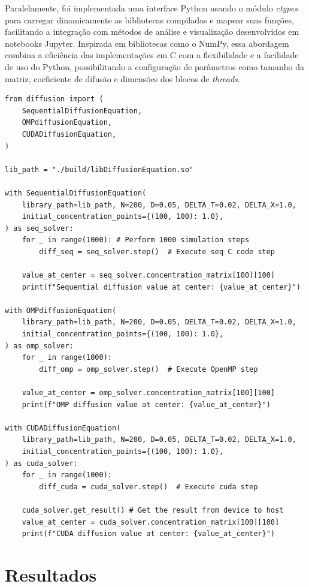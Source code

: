\documentclass[12pt]{article}
\begin{document}
Paralelamente, foi implementada uma interface Python usando o módulo
\textit{ctypes} para carregar dinamicamente as bibliotecas compiladas e mapear
suas funções, facilitando a integração com métodos de análise e visualização
desenvolvidos em notebooks Jupyter. Inspirada em bibliotecas como o NumPy, essa
abordagem combina a eficiência das implementações em C com a flexibilidade e a
facilidade de uso do Python, possibilitando a configuração de parâmetros como
tamanho da matriz, coeficiente de difusão e dimensões dos blocos de
\textit{threads}.

\begin{lstlisting}[style=PythonStyle, caption={Implementação paralelizada utilizando CUDA.}, label={cod:pythonlib}]
from diffusion import (
    SequentialDiffusionEquation,
    OMPdiffusionEquation,
    CUDADiffusionEquation,
)

lib_path = "./build/libDiffusionEquation.so"

with SequentialDiffusionEquation(
    library_path=lib_path, N=200, D=0.05, DELTA_T=0.02, DELTA_X=1.0,
    initial_concentration_points={(100, 100): 1.0},
) as seq_solver:
    for _ in range(1000): # Perform 1000 simulation steps
        diff_seq = seq_solver.step()  # Execute seq C code step
    
    value_at_center = seq_solver.concentration_matrix[100][100]
    print(f"Sequential diffusion value at center: {value_at_center}")

with OMPdiffusionEquation(
    library_path=lib_path, N=200, D=0.05, DELTA_T=0.02, DELTA_X=1.0,
    initial_concentration_points={(100, 100): 1.0},
) as omp_solver:
    for _ in range(1000):
        diff_omp = omp_solver.step()  # Execute OpenMP step
    
    value_at_center = omp_solver.concentration_matrix[100][100]
    print(f"OMP diffusion value at center: {value_at_center}")

with CUDADiffusionEquation(
    library_path=lib_path, N=200, D=0.05, DELTA_T=0.02, DELTA_X=1.0,
    initial_concentration_points={(100, 100): 1.0},
) as cuda_solver:
    for _ in range(1000):
        diff_cuda = cuda_solver.step()  # Execute cuda step
    
    cuda_solver.get_result() # Get the result from device to host
    value_at_center = cuda_solver.concentration_matrix[100][100]
    print(f"CUDA diffusion value at center: {value_at_center}")
\end{lstlisting}

\section{Resultados}
\end{document}
